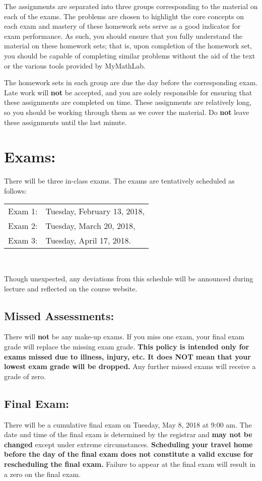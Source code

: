 \documentclass[10pt]{amsart}
\begin{document}
The assignments are separated into three groups corresponding to the material on each of the exams.
The problems are chosen to highlight the core concepts on each exam and mastery of these homework sets serve as a good indicator for exam performance.
As such, you should ensure that you fully understand the material on these homework sets; that is, upon completion of the homework set, you should be capable of completing similar problems without the aid of the text or the various tools provided by MyMathLab.

The homework sets in each group are due the day before the corresponding exam.
Late work will {\bf not} be accepted, and you are solely responsible for ensuring that these assignments are completed on time.
These assignments are relatively long, so you should be working through them as we cover the material.
Do {\bf not} leave these assignments until the last minute.

\section*{Exams:}
\noindent There will be three in-class exams.
The exams are tentatively scheduled as follows:
\begin{center}
  \begin{tabular}{ll}
    Exam 1: & Tuesday, February 13, 2018,\\
    Exam 2: & Tuesday, March 20, 2018,\\
    Exam 3: & Tuesday, April 17, 2018.\\
  \end{tabular}\\
\end{center}
Though unexpected, any deviations from this schedule will be announced during lecture and reflected on the course website.

\subsection*{Missed Assessments:}
There will {\bf not} be any make-up exams.
If you miss one exam, your final exam grade will replace the missing exam grade.
\textbf{This policy is intended only for exams missed due to illness, injury, etc.  
  It does NOT mean that your lowest exam grade will be dropped.}
Any further missed exams will receive a grade of zero.

\subsection*{Final Exam:} There will be a cumulative final exam on Tuesday, May 8, 2018 at 9:00 am.
The date and time of the final exam is determined by the registrar and \textbf{may not be changed} except under extreme circumstances.
\textbf{Scheduling your travel home before the day of the final exam does not constitute a valid excuse for rescheduling the final exam.}
Failure to appear at the final exam will result in a zero on the final exam.
\end{document}
